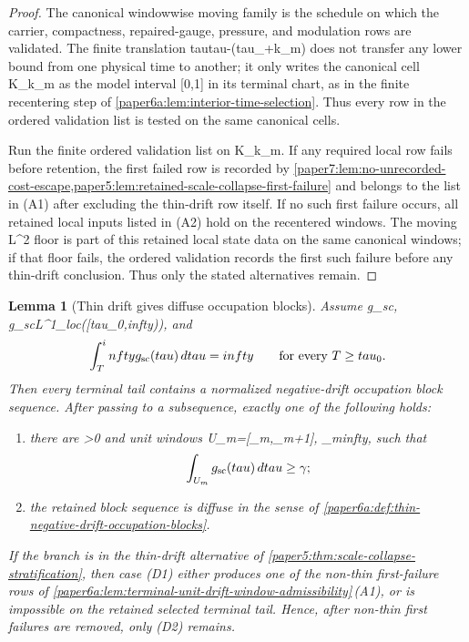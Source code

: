 \documentclass[11pt]{amsart}
\def\({}%
\def\){}%
\def\tau{tau}%
\def\infty{infty}%
\theoremstyle{plain}
\newtheorem{lemma}[lemma]{Lemma}
\theoremstyle{definition}
\theoremstyle{remark}
\begin{document}
\begin{proof}
The canonical windowwise moving family is the schedule on which the carrier,
compactness, repaired-gauge, pressure, and modulation rows are validated.  The
finite translation \(\tau\mapsto\tau-(\tau_\sharp+k_m)\) does not transfer any
lower bound from one physical time to another; it only writes the canonical
cell \(K_{k_m}\) as the model interval \([0,1]\) in its terminal chart, as in
the finite recentering step of
\cref{paper6a:lem:interior-time-selection}.  Thus every row in the ordered
validation list is tested on the same canonical cells.
\par
Run the finite ordered validation list on \(K_{k_m}\).  If any required
local row fails before retention, the first failed row is recorded by
\cref{paper7:lem:no-unrecorded-cost-escape,paper5:lem:retained-scale-collapse-first-failure}
and belongs to the list in \textup{(A1)} after excluding the thin-drift row
itself.  If no such first failure occurs, all retained local inputs listed in
\textup{(A2)} hold on the recentered windows.  The moving \(L^2\) floor is
part of this retained local state data on the same canonical windows; if that
floor fails, the ordered validation records the first such failure before any
thin-drift conclusion.  Thus only the stated alternatives remain.
\end{proof}

\begin{lemma}[Thin drift gives diffuse occupation blocks]
\label{paper6a:lem:thin-drift-diffuse-blocks}
Assume \(g_{\rm sc}\), \(g_{\rm sc}\in L^1_{\rm loc}([\tau_0,\infty))\),
and
\[
  \int_T^\infty g_{\rm sc}(\tau)\,d\tau=\infty
  \qquad\text{for every }T\ge\tau_0 .
\]
Then every terminal tail contains a normalized negative-drift occupation block
sequence.  After passing to a subsequence, exactly one of the following holds:
\begin{enumerate}[label=\textup{(D\arabic*)}]
\item there are \(\gamma>0\) and unit windows \(U_m=[\sigma_m,\sigma_m+1]\),
      \(\sigma_m\to\infty\), such that
      \[
        \int_{U_m}g_{\rm sc}(\tau)\,d\tau\ge\gamma ;
      \]
\item the retained block sequence is diffuse in the sense of
      \cref{paper6a:def:thin-negative-drift-occupation-blocks}.
\end{enumerate}
If the branch is in the thin-drift alternative of
\cref{paper5:thm:scale-collapse-stratification}, then case
\textup{(D1)} either produces one of the non-thin first-failure rows of
\cref{paper6a:lem:terminal-unit-drift-window-admissibility}\,\textup{(A1)}, or
is impossible on the retained selected terminal tail.  Hence, after non-thin
first failures are removed, only \textup{(D2)} remains.
\end{lemma}
\end{document}
